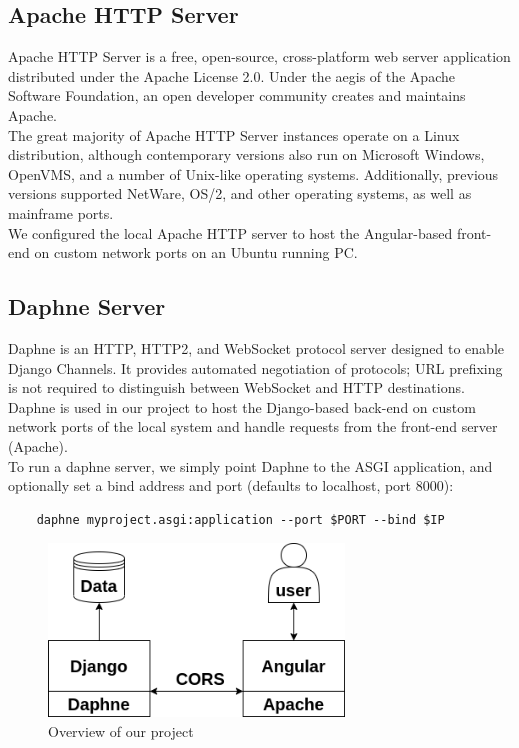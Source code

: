 \subsection{Apache HTTP Server}
\normalsize{
Apache HTTP Server is a free, open-source, cross-platform web server application distributed under the Apache License 2.0. Under the aegis of the Apache Software Foundation, an open developer community creates and maintains Apache.\cite{enwiki:1100527453}\\

The great majority of Apache HTTP Server instances operate on a Linux distribution, although contemporary versions also run on Microsoft Windows, OpenVMS, and a number of Unix-like operating systems. Additionally, previous versions supported NetWare, OS/2, and other operating systems, as well as mainframe ports.\cite{enwiki:1100527453}\\

We configured the local Apache HTTP server to host the Angular-based front-end on custom network ports on an Ubuntu running PC.
}
\clearpage

\subsection{Daphne Server}
\normalsize{
Daphne is an HTTP, HTTP2, and WebSocket protocol server designed to enable Django Channels. It provides automated negotiation of protocols; URL prefixing is not required to distinguish between WebSocket and HTTP destinations.\cite{daphne} \\

Daphne is used in our project to host the Django-based back-end on custom network ports of the local system and handle requests from the front-end server (Apache). \\

To run a daphne server, we simply point Daphne to the ASGI application, and optionally set a bind address and port (defaults to localhost, port 8000):
\begin{verbatim}
    daphne myproject.asgi:application --port $PORT --bind $IP
\end{verbatim}
}
\begin{figure}[h!]
    \centering
    \includegraphics[width=0.7\textwidth,keepaspectratio]{images/workflow-treadwill.drawio.png}
    \caption*{Overview of our project}
\end{figure}
